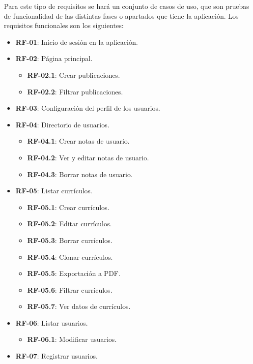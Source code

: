 Para este tipo de requisitos se hará un conjunto de casos de uso, que son pruebas de funcionalidad
de las distintas fases o apartados que tiene la aplicación. Los requisitos funcionales
son los siguientes:
\begin{itemize}
\tightlist
 \item \textbf{RF-01}: Inicio de sesión en la aplicación.
 \item \textbf{RF-02}: Página principal.
    \begin{itemize}
    \tightlist
     \item \textbf{RF-02.1}: Crear publicaciones.
     \item \textbf{RF-02.2}: Filtrar publicaciones.
    \end{itemize}
 \item \textbf{RF-03}: Configuración del perfil de los usuarios.
 \item \textbf{RF-04}: Directorio de usuarios.
    \begin{itemize}
    \tightlist
     \item \textbf{RF-04.1}: Crear notas de usuario.
     \item \textbf{RF-04.2}: Ver y editar notas de usuario.
     \item \textbf{RF-04.3}: Borrar notas de usuario.
    \end{itemize}
 \item \textbf{RF-05}: Listar currículos.
    \begin{itemize}
    \tightlist
     \item \textbf{RF-05.1}: Crear currículos.
     \item \textbf{RF-05.2}: Editar currículos.
     \item \textbf{RF-05.3}: Borrar currículos.
     \item \textbf{RF-05.4}: Clonar currículos.
     \item \textbf{RF-05.5}: Exportación a PDF.
     \item \textbf{RF-05.6}: Filtrar currículos.
     \item \textbf{RF-05.7}: Ver datos de currículos.
    \end{itemize}
 \item \textbf{RF-06}: Listar usuarios.
    \begin{itemize}
    \tightlist
     \item \textbf{RF-06.1}: Modificar usuarios.
    \end{itemize}
 \item \textbf{RF-07}: Registrar usuarios.
\end{itemize}

